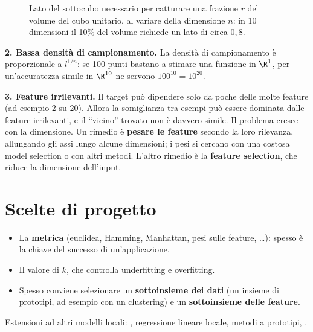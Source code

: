 \begin{figure}[ht]
\centering
{}
\caption{Lato del sottocubo necessario per catturare una frazione $r$ del volume del cubo unitario, al variare
della dimensione $n$: in 10 dimensioni il 10\% del volume richiede un lato di circa $0{,}8$.}
\label{fig:curse}
\end{figure}

\textbf{2. Bassa densità di campionamento.} La densità di campionamento è proporzionale a $l^{1/n}$: se 100 punti
bastano a stimare una funzione in $\R^1$, per un'accuratezza simile in $\R^{10}$ ne servono $100^{10}=10^{20}$.

\textbf{3. Feature irrilevanti.} Il target può dipendere solo da poche delle molte feature (ad esempio 2 su
20). Allora la somiglianza tra esempi può essere dominata dalle feature irrilevanti, e il ``vicino'' trovato non
è davvero simile. Il problema cresce con la dimensione. Un rimedio è \textbf{pesare le feature} secondo la loro
rilevanza, allungando gli assi lungo alcune dimensioni; i pesi si cercano con una costosa model selection o con
altri metodi. L'altro rimedio è la \textbf{feature selection}, che riduce la dimensione dell'input.

\section{Scelte di progetto}

\begin{itemize}
  \item La \textbf{metrica} (euclidea, Hamming, Manhattan, pesi sulle feature, \dots): spesso è la chiave del
        successo di un'applicazione.
  \item Il valore di \textbf{$k$}, che controlla underfitting e overfitting.
  \item Spesso conviene selezionare un \textbf{sottoinsieme dei dati} (un insieme di prototipi, ad esempio con un
        clustering) e un \textbf{sottoinsieme delle feature}.
\end{itemize}
Estensioni ad altri modelli locali: , regressione lineare locale, metodi a prototipi,
.

